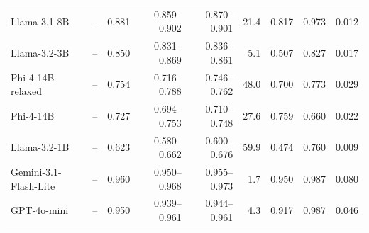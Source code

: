 \begin{table}[t]
\begin{tabular}{lrrrrrrrr}
Llama-3.1-8B & -- & 0.881 & 0.859--0.902 & 0.870--0.901 & 21.4 & 0.817 & 0.973 & 0.012 \\
Llama-3.2-3B & -- & 0.850 & 0.831--0.869 & 0.836--0.861 & 5.1 & 0.507 & 0.827 & 0.017 \\
Phi-4-14B relaxed & -- & 0.754 & 0.716--0.788 & 0.746--0.762 & 48.0 & 0.700 & 0.773 & 0.029 \\
Phi-4-14B & -- & 0.727 & 0.694--0.753 & 0.710--0.748 & 27.6 & 0.759 & 0.660 & 0.022 \\
Llama-3.2-1B & -- & 0.623 & 0.580--0.662 & 0.600--0.676 & 59.9 & 0.474 & 0.760 & 0.009 \\
\midrule
Gemini-3.1-Flash-Lite & -- & 0.960 & 0.950--0.968 & 0.955--0.973 & 1.7 & 0.950 & 0.987 & 0.080 \\
GPT-4o-mini & -- & 0.950 & 0.939--0.961 & 0.944--0.961 & 4.3 & 0.917 & 0.987 & 0.046 \\
\bottomrule
\end{tabular}
\end{table}
